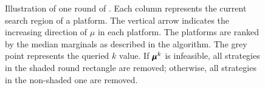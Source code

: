 \begin{figure}[h]
\begin{center}
{
    }
\end{center}
\caption{Illustration of one round of \mom. Each column represents the current search region of a platform. The vertical arrow indicates the increasing direction of $\mu$ in each platform. The platforms are ranked by the median marginals as described in the algorithm. The grey point represents the queried $k$ value. If $\pmb{\mu}^k$ is infeasible, all strategies in the shaded round rectangle are removed; otherwise, all strategies in the non-shaded one are removed.}
\end{figure}





